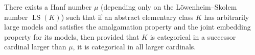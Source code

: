 There exists a Hanf number $\mu$ (depending only on the Löwenheim--Skolem number $\operatorname{LS}(K)$) such that if an abstract elementary class $K$ has arbitrarily large models and satisfies the amalgamation property and the joint embedding property for its models, then provided that $K$ is categorical in a successor cardinal larger than $\mu$, it is categorical in all larger cardinals.
